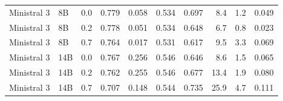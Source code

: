 \begin{tabular}{llrrrrrrrr}
Ministral 3 & 8B & 0.0 & 0.779 & 0.058 & 0.534 & 0.697 & 8.4 & 1.2 & 0.049 \\
Ministral 3 & 8B & 0.2 & 0.778 & 0.051 & 0.534 & 0.648 & 6.7 & 0.8 & 0.023 \\
Ministral 3 & 8B & 0.7 & 0.764 & 0.017 & 0.531 & 0.617 & 9.5 & 3.3 & 0.069 \\
Ministral 3 & 14B & 0.0 & 0.767 & 0.256 & 0.546 & 0.646 & 8.6 & 1.5 & 0.065 \\
Ministral 3 & 14B & 0.2 & 0.762 & 0.255 & 0.546 & 0.677 & 13.4 & 1.9 & 0.080 \\
Ministral 3 & 14B & 0.7 & 0.707 & 0.148 & 0.544 & 0.735 & 25.9 & 4.7 & 0.111 \\
\bottomrule
\end{tabular}
